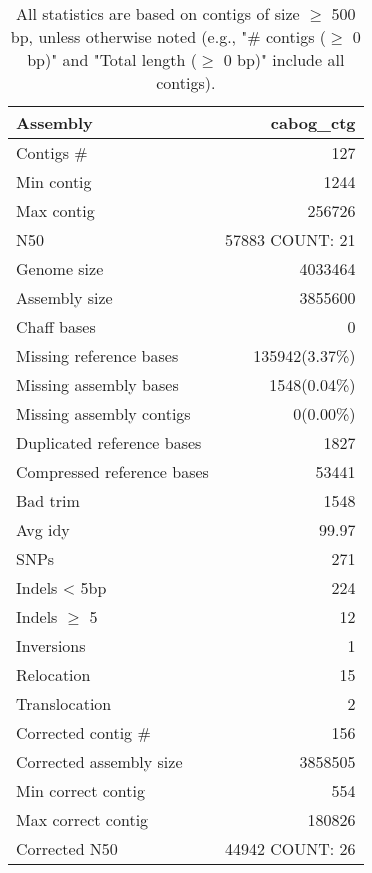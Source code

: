 \documentclass[12pt,a4paper]{article}
\begin{document}
\begin{table}[ht]
\begin{center}
\caption{All statistics are based on contigs of size $\geq$ 500 bp, unless otherwise noted (e.g., "\# contigs ($\geq$ 0 bp)" and "Total length ($\geq$ 0 bp)" include all contigs).}
\begin{tabular}{|l*{1}{|r}|}
\hline
Assembly & cabog\_ctg \\ \hline
Contigs \# & 127 \\ \hline
Min contig & 1244 \\ \hline
Max contig & 256726 \\ \hline
N50 & 57883 COUNT: 21 \\ \hline
Genome size & 4033464 \\ \hline
Assembly size & 3855600 \\ \hline
Chaff bases & 0 \\ \hline
Missing reference bases & 135942(3.37\%) \\ \hline
Missing assembly bases & 1548(0.04\%) \\ \hline
Missing assembly contigs & 0(0.00\%) \\ \hline
Duplicated reference bases & 1827 \\ \hline
Compressed reference bases & 53441 \\ \hline
Bad trim & 1548 \\ \hline
Avg idy & 99.97 \\ \hline
SNPs & 271 \\ \hline
Indels < 5bp & 224 \\ \hline
Indels $\geq$ 5 & 12 \\ \hline
Inversions & 1 \\ \hline
Relocation & 15 \\ \hline
Translocation & 2 \\ \hline
Corrected contig \# & 156 \\ \hline
Corrected assembly size & 3858505 \\ \hline
Min correct contig & 554 \\ \hline
Max correct contig & 180826 \\ \hline
Corrected N50 & 44942 COUNT: 26 \\ \hline
\end{tabular}
\end{center}
\end{table}
\end{document}
